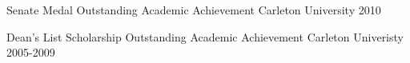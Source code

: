 




\begin{cvhonors}


\cvhonor
{Senate Medal} %
{Outstanding Academic Achievement} %
{Carleton University} %
{2010} %


\cvhonor
{Dean's List Scholarship} %
{Outstanding Academic Achievement} %
{Carleton Univeristy} %
{2005-2009} %


\end{cvhonors}
